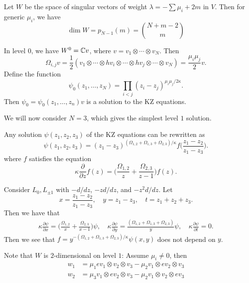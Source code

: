 \begin{prop}
  Let $W$ be the space of singular vectors of
  weight $\lambda = -\sum \mu_i + 2m$ in $V$.
  Then for generic $\mu_i$, we have
  \[
    \dim W = p_{N - 1}(m)
    = \binom{N + m - 2}{m}
  \]
\end{prop}

\begin{remark}
  In level $0$, we have
  $W^0 = \mathbb{C} v$, where
  $v = v_1 \otimes \cdots \otimes v_N$.
  Then
  \[
    \Omega_{i, j} v
    = \frac{1}{2} (v_1 \otimes \cdots \otimes hv_i \otimes \cdots \otimes hv_j \otimes \cdots \otimes v_N)
    = \frac{\mu_i \mu_j}{2} v.
  \]
  \pagebreak
  Define the function
  \[
    \psi_0(z_1, \dots, z_N)
    = \prod_{i < j} (z_i - z_j)^{\mu_i \mu_j / 2 \kappa}.
  \]
  Then $\psi_0 = \psi_0(z_1, \dots, z_n) v$
  is a solution to the KZ equations.

  We will now consider $N = 3$, which gives
  the simplest level $1$ solution.
\end{remark}

\begin{prop}
  Any solution $\psi(z_1, z_2, z_3)$ of the
  KZ equations can be rewritten as
  \[
    \psi(z_1, z_2, z_3)
    = (z_1 - z_3)^{(\Omega_{1, 2} + \Omega_{1, 3} + \Omega_{2, 3}) / \kappa}
    f \bigg(\frac{z_1 - z_2}{z_1 - z_3}\bigg).
  \]
  where $f$ satisfies the equation
  \[
    \kappa \frac{\partial}{\partial z} f(z)
    = \bigg(\frac{\Omega_{1, 2}}{z} + \frac{\Omega_{2, 3}}{z - 1}\bigg) f(z). \tag{$*$}
  \]
\end{prop}

\begin{remark}
  Consider $L_0, L_{\pm 1}$ with
  $-d / dz$, $-z d / dz$, and $-z^2 d / dz$. Let
  \[
    x = \frac{z_1 - z_2}{z_1 - z_3}, \quad
    y = z_1 - z_3, \quad t = z_1 + z_2 + z_3.
  \]
  Then we have that
  \begin{align*}
    \kappa \frac{\partial \psi}{\partial x} =
    \bigg(
      \frac{\Omega_{1, 2}}{x}
      + \frac{\Omega_{2, 3}}{x - 1}
    \bigg) \psi, \quad
    \kappa \frac{\partial \psi}{\partial y} =
    \frac{(\Omega_{1, 2} + \Omega_{1, 3} + \Omega_{2, 3})}{y} \psi, \quad
    \kappa \frac{\partial \psi}{\partial t} = 0.
  \end{align*}
  Then we see that
  $f = y^{-(\Omega_{1, 2} + \Omega_{1, 3} + \Omega_{2, 3}) / \kappa} \psi(x, y)$
  does not depend on $y$.
\end{remark}

\begin{remark}
  Note that $W$ is $2$-dimensional on level
  $1$: Assume $\mu_i \ne 0$, then
  \begin{align*}
    w_1 &= \mu_1 ev_1 \otimes v_2 \otimes v_3 - \mu_2 v_1 \otimes ev_2 \otimes v_3 \\
    w_2 &=
    \mu_3 v_1 \otimes ev_2 \otimes v_3 - \mu_2 v_1 \otimes v_2 \otimes ev_3
  \end{align*}
\end{remark}

